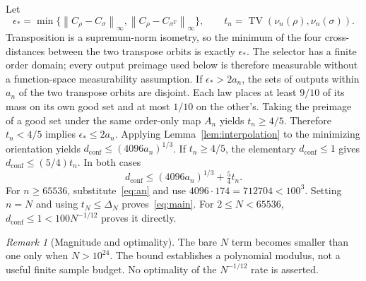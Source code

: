 \documentclass[11pt]{article}
\theoremstyle{remark}
\newtheorem{remark}[theorem]{Remark}
\newcommand{\TV}{\operatorname{TV}}
\newcommand{\dc}{d_{\mathrm{conf}}}
\newcommand{\norm}[1]{\left\lVert #1\right\rVert_\infty}
\begin{document}
Let
\[
 \epsilon_* =\min\{\norm{C_\rho-C_\sigma},
                         \norm{C_\rho-C_{\sigma^T}}\},\qquad
 t_n=\TV(\nu_n(\rho),\nu_n(\sigma)).
\]
Transposition is a supremum-norm isometry, so the minimum of the four
cross-distances between the two transpose orbits is exactly $\epsilon_*$.
The selector has a finite order domain; every output preimage used below
is therefore measurable without a function-space measurability assumption.
If $\epsilon_*>2a_n$, the sets of outputs within $a_n$ of the two
transpose orbits are disjoint. Each law places at least $9/10$ of
its mass on its own good set and at most $1/10$ on the other's.
Taking the preimage of a good set under the same order-only map
$A_n$ yields $t_n\ge4/5$. Therefore $t_n<4/5$ implies
$\epsilon_*\le2a_n$. Applying Lemma~\ref{lem:interpolation} to
the minimizing orientation yields
$\dc\le(4096a_n)^{1/3}$. If $t_n\ge4/5$, the elementary
$\dc\le1$ gives $\dc\le(5/4)t_n$. In both cases
\[
 \dc\le(4096a_n)^{1/3}+\tfrac54t_n.
\]
For $n\ge65536$, substitute~\eqref{eq:an} and use
$4096\cdot174=712704<100^3$. Setting $n=N$ and using
$t_N\le\Delta_N$ proves~\eqref{eq:main}. For $2\le N<65536$,
$\dc\le1<100N^{-1/12}$ proves it directly.

\begin{remark}[Magnitude and optimality]
The bare $N$ term becomes smaller than one only when $N>10^{24}$.
The bound establishes a polynomial modulus, not a useful finite sample
budget. No optimality of the $N^{-1/12}$ rate is asserted.
\end{remark}
\end{document}
